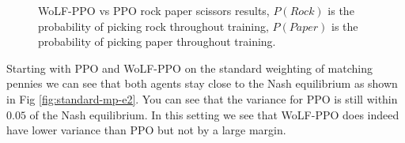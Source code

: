 \documentclass[conference]{IEEEtran}
\begin{document}
\begin{figure}[htbp]
    \caption{WoLF-PPO vs PPO rock paper scissors results, $P(Rock)$ is the probability of picking rock throughout training, $P(Paper)$ is the probability of picking paper throughout training.}
\end{figure}

Starting with PPO and WoLF-PPO on the standard weighting of matching pennies we can see that both agents stay close to the Nash equilibrium as shown in Fig \ref{fig:standard-mp-e2}. You can see that the variance for PPO is still within $0.05$ of the Nash equilibrium. In this setting we see that WoLF-PPO does indeed have lower variance than PPO but not by a large margin.
\end{document}
